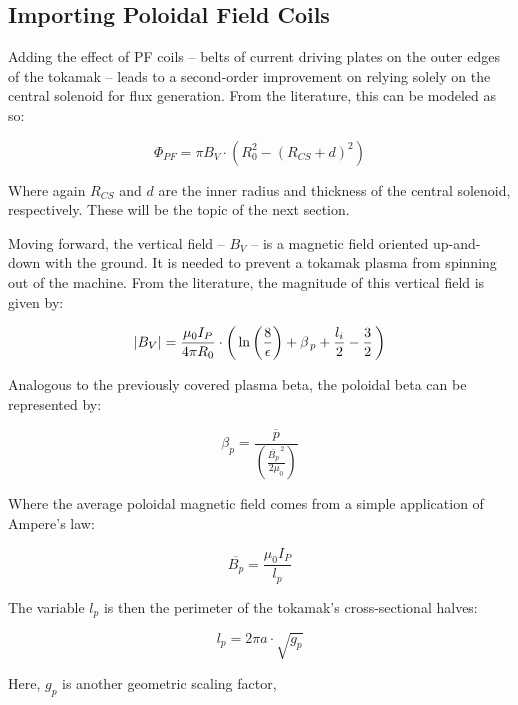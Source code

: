 \subsection{Importing Poloidal Field Coils}

Adding the effect of PF coils -- belts of current driving plates on the outer edges of the tokamak -- leads to a second-order improvement on relying solely on the central solenoid for flux generation. From the literature, this can be modeled as so:

\begin{equation}
	\label{eq:phipf}
	\Phi_{PF} = \pi B_V \cdot \left( R_0^2 - ( R_{CS} + d ) ^ 2 \right)
\end{equation}

Where again $R_{CS}$ and $d$ are the inner radius and thickness of the central solenoid, respectively. These will be the topic of the next section.

Moving forward, the vertical field -- $B_V$ -- is a magnetic field oriented up-and-down with the ground. It is needed to prevent a tokamak plasma from spinning out of the machine. From the literature, the magnitude of this vertical field is given by:

\begin{equation}
  |B_V| = \frac{\mu_0 I_P}{4 \pi R_0} \cdot \left( \,\textnormal{ln} \left(\frac{8}{\epsilon}\right) + \beta_{\,p} + \frac{l_i}{2} - \frac{3}{2} \, \right)
\end{equation} 

Analogous to the previously covered plasma beta, the poloidal beta can be represented by:

\begin{equation}
  \beta_p = \frac{\overline{p}}{\left( \frac{\overline{B_p}^{\,2}}{2 \mu_0} \right)}
\end{equation}

Where the average poloidal magnetic field comes from a simple application of Ampere's law:

\begin{equation}
	\overline{B_p} = \frac{\mu_0 I_P}{l_p}
\end{equation}

The variable $l_p$ is then the perimeter of the tokamak's cross-sectional halves:

\begin{equation}
	l_p = 2 \pi a \cdot \sqrt{g_p}
\end{equation}

Here, $g_p$ is another geometric scaling factor,

